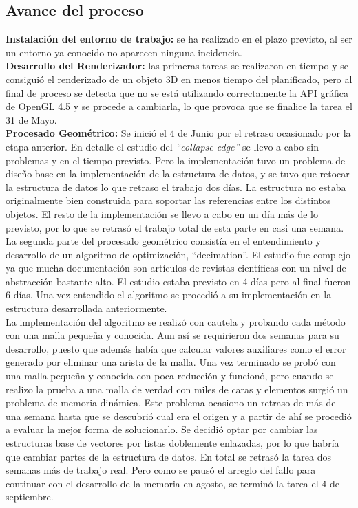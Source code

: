\subsection{ Avance del proceso}

\textbf{Instalación del entorno de trabajo:} se ha realizado en el plazo previsto, al ser un entorno ya conocido no aparecen ninguna incidencia.\\

\textbf{Desarrollo del Renderizador:} las primeras tareas se realizaron en tiempo y se consiguió el renderizado de un objeto 3D en menos tiempo del planificado, pero al final de proceso se detecta que no se está utilizando correctamente la API gráfica de OpenGL 4.5 y se procede a cambiarla, lo que provoca que se finalice la tarea el 31 de Mayo.\\

\textbf{Procesado Geométrico:} Se inició el 4 de Junio por el retraso ocasionado por la etapa anterior. En detalle el estudio del \textit{``collapse edge''} se llevo a cabo sin problemas y en el tiempo previsto. Pero la implementación tuvo un problema de diseño base en la implementación de la estructura de datos, y se tuvo que retocar la estructura de datos lo que retraso el trabajo dos días. La estructura no estaba originalmente bien construida para soportar las referencias entre los distintos objetos. El resto de la implementación se llevo a cabo en un día más de lo previsto, por lo que se retrasó el trabajo total de esta parte en casi una semana.\\

La segunda parte del procesado geométrico consistía en el entendimiento y desarrollo de un algoritmo de optimización, ``decimation''. El estudio fue complejo ya que mucha documentación son artículos de revistas científicas con un nivel de abstracción bastante alto. El estudio estaba previsto en 4 días pero al final fueron 6 días. 
Una vez entendido el algoritmo se procedió a su implementación en la estructura desarrollada anteriormente.\\

La implementación del algoritmo se realizó con cautela y probando cada método con una malla pequeña y conocida. Aun así se requirieron dos semanas para su desarrollo, puesto que además había que calcular valores auxiliares como el error generado por eliminar una arista de la malla. Una vez terminado se probó con una malla pequeña y conocida con poca reducción y funcionó, pero cuando se realizo la prueba a una malla de verdad con miles de caras y elementos surgió un problema de memoria dinámica. Este problema ocasiono un retraso de más de una semana hasta que se descubrió cual era el origen y a partir de ahí se procedió a evaluar la mejor forma de solucionarlo. Se decidió optar por cambiar las estructuras base de vectores por listas doblemente enlazadas, por lo que habría que cambiar partes de la estructura de datos. En total se retrasó la tarea dos semanas más de trabajo real. Pero como se pausó el arreglo del fallo para continuar con el desarrollo de la memoria en agosto, se terminó la tarea el 4 de septiembre. \\

